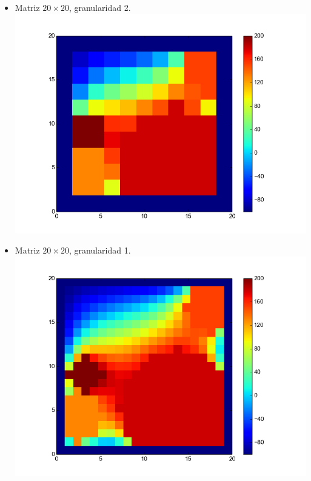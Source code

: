 \begin{itemize}
 \item Matriz $20 \times 20$, granularidad 2.\\
  \includegraphics[width=400pt]{imagenes/imagen11.png}

 \item Matriz $20 \times 20$, granularidad 1.\\
  \includegraphics[width=400pt]{imagenes/imagen21.png}


\end{itemize}
